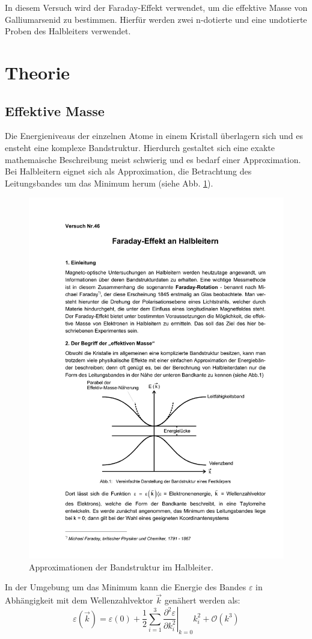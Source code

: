 In diesem Versuch wird der Faraday-Effekt verwendet, um die effektive Masse von
Galliumarsenid zu bestimmen. Hierfür werden zwei n-dotierte und eine undotierte
Proben des Halbleiters verwendet.

\section{Theorie}
\label{sec:Theorie}

\subsection{Effektive Masse}\label{sec:effektive_masse}
Die Energieniveaus der einzelnen Atome in einem Kristall überlagern sich und es ensteht eine komplexe Bandstruktur.
Hierdurch gestaltet sich eine exakte mathemaische Beschreibung meist schwierig und es bedarf
einer Approximation.
Bei Halbleitern eignet sich als Approximation, die Betrachtung des Leitungsbandes um das Minimum herum (siehe Abb. \ref{fig:band}).
\begin{figure}
\centering
\includegraphics[width=0.5\linewidth]{./content/images/band.pdf}
\caption{Approximationen der Bandstruktur im Halbleiter.}
\label{fig:band}
\end{figure}
In der Umgebung um das Minimum kann die Energie des Bandes $\varepsilon$
in Abhängigkeit mit dem Wellenzahlvektor $\vec{k}$ genähert werden als:
\begin{equation}
  \label{eq:gleichung_energie}
  \varepsilon(\vec{k})=\varepsilon(0) + \frac{1}{2}\sum_{i=1}^3 \left.\frac{\partial^2 \varepsilon}{\partial k_i^2}\right|_{k=0}k_i^2 + \mathcal{O}(k^3)
\end{equation}
